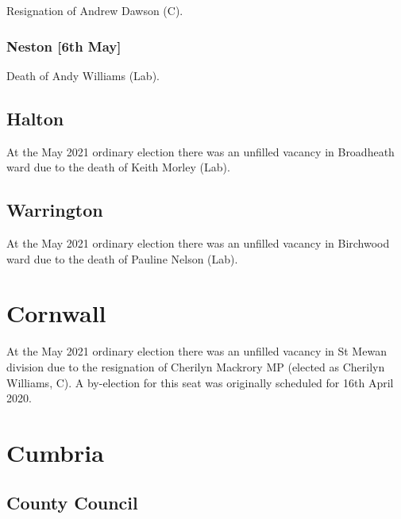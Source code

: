 \documentclass[a4paper,openany]{book}
\begin{document}
\begin{resultsiii}

Resignation of Andrew Dawson (C).

\subsubsection*{Neston \hspace*{\fill}\nolinebreak[1]%
	\enspace\hspace*{\fill}
	[6th May]}


Death of Andy Williams (Lab).

\subsection*{Halton}

At the May 2021 ordinary election there was an unfilled vacancy in Broadheath ward due to the death of Keith Morley (Lab).

\subsection*{Warrington}

At the May 2021 ordinary election there was an unfilled vacancy in Birchwood ward due to the death of Pauline Nelson (Lab).

\section{Cornwall}

At the May 2021 ordinary election there was an unfilled vacancy in St Mewan division due to the resignation of Cherilyn Mackrory MP (elected as Cherilyn Williams, C).  A by-election for this seat was originally scheduled for 16th April 2020.

\section{Cumbria}

\subsection*{County Council}


\end{resultsiii}
\end{document}
